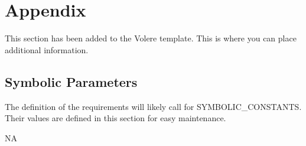 \documentclass[12pt, titlepage]{article}
\begin{document}


\newpage

\section{Appendix}

This section has been added to the Volere template.  This is where you can place
additional information.

\subsection{Symbolic Parameters}

The definition of the requirements will likely call for SYMBOLIC\_CONSTANTS.
Their values are defined in this section for easy maintenance.

NA 
\end{document}
